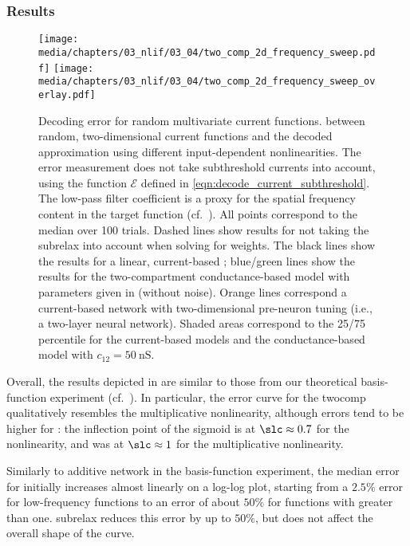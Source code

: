 \subsubsection{Results}

\begin{figure}
	\centering
	\texttt{[image: media/chapters/03\_nlif/03\_04/two\_comp\_2d\_frequency\_sweep.pdf]}%
	\kern-158.06mm\texttt{[image: media/chapters/03\_nlif/03\_04/two\_comp\_2d\_frequency\_sweep\_overlay.pdf]}
	\caption[Decoding error for random multivariate current functions]{Decoding error for random multivariate current functions.
	\NRMSE between random, two-dimensional current functions and the decoded approximation using different input-dependent nonlinearities. The error measurement does not take subthreshold currents into account, using the function $\mathcal{E}$ defined in \cref{eqn:decode_current_subthreshold}. The low-pass filter coefficient \slc is a proxy for the spatial frequency content in the target function (cf.~). All points correspond to the median over \num{100} trials. Dashed lines show results for not taking the \gls{subrelax} into account when solving for weights. The black lines show the results for a linear, current-based \Hcur; blue/green lines show the results for the two-compartment conductance-based model  \Hcond with parameters given in  (without noise). Orange lines correspond a current-based network with two-dimensional pre-neuron tuning (i.e., a two-layer neural network). Shaded areas correspond to the 25/75 percentile for the current-based models and the conductance-based model with $c_{12} = \SI{50}{\nano\siemens}$.
	}
	\label{fig:two_comp_lif_frequency_sweep}
\end{figure}

Overall, the results depicted in  are similar to those from our theoretical basis-function experiment  (cf.~).
In particular, the error curve for the \gls{twocomp} qualitatively resembles the multiplicative nonlinearity, although errors tend to be higher for \Hcond:
the inflection point of the sigmoid is at $\slc \approx 0.7$ for the \twocomplif nonlinearity, and was at $\slc \approx 1$ for the multiplicative nonlinearity.

Similarly to additive network in the basis-function experiment, the median error for \Hcur initially increases almost linearly on a log-log plot, starting from a $2.5\%$ error for low-frequency functions to an error of about $50\%$ for functions with \slc greater than one.
\Gls{subrelax} reduces this error by up to $50\%$, but does not affect the overall shape of the curve.

